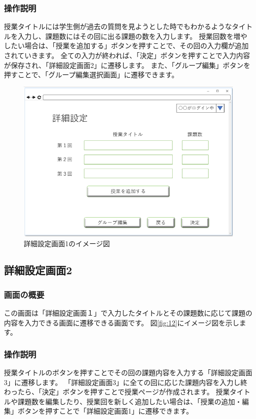\subsubsection{操作説明}
授業タイトルには学生側が過去の質問を見ようとした時でもわかるようなタイトルを入力し、課題数にはその回に出る課題の数を入力します。
授業回数を増やしたい場合は、「授業を追加する」ボタンを押すことで、その回の入力欄が追加されていきます。
全ての入力が終われば、「決定」ボタンを押すことで入力内容が保存され、「詳細設定画面2」に遷移します。
また、「グループ編集」ボタンを押すことで、「グループ編集選択画面」に遷移できます。

\begin{figure}[htbp]
  \begin{center}
    \includegraphics[width=0.7\linewidth,clip]{./img/11.png}
    \caption{詳細設定画面1のイメージ図}\label{fig:11}
  \end{center}
\end{figure}

\newpage

\subsection{詳細設定画面2}
\subsubsection{画面の概要}
この画面は「詳細設定画面１」で入力したタイトルとその課題数に応じて課題の内容を入力できる画面に遷移できる画面です。
図\ref{fig:12}にイメージ図を示します。

\subsubsection{操作説明}
授業タイトルのボタンを押すことでその回の課題内容を入力する「詳細設定画面3」に遷移します。
「詳細設定画面3」に全ての回に応じた課題内容を入力し終わったら、「決定」ボタンを押すことで授業ページが作成されます。
授業タイトルや課題数を編集したり、授業回を新しく追加したい場合は、「授業の追加・編集」ボタンを押すことで「詳細設定画面1」に遷移できます。

